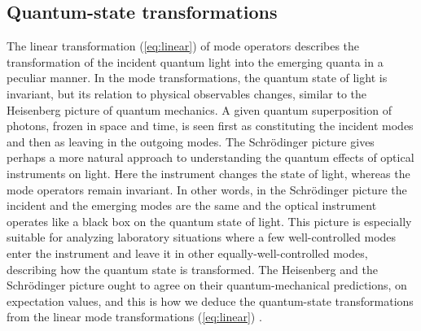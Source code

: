 \documentclass[12pt,amsmath,amssymb]{article}
\numberwithin{equation}{section}
\begin{document}
\subsection{Quantum-state transformations}

The linear transformation (\ref{eq:linear}) of mode operators describes
the transformation of the incident quantum light into the emerging
quanta in a peculiar manner.
In the mode transformations, the quantum state of light is invariant,
but its relation to physical observables changes,
similar to the Heisenberg picture of quantum mechanics.
A given quantum superposition of photons, frozen in space and time,
is seen first as constituting the incident modes and then as leaving
in the outgoing modes.
The Schr\"odinger picture gives perhaps a more natural approach
to understanding the quantum effects of optical instruments on light.
Here the instrument changes the state of light, whereas the mode
operators remain invariant. In other words, in the Schr\"odinger
picture the incident and the emerging modes are the same and the
optical instrument operates like a black box on the quantum state of light.
This picture is especially suitable for analyzing laboratory situations
where a few well-controlled modes enter the instrument and leave it
in other equally-well-controlled modes, describing how the quantum
state is transformed. The Heisenberg and the Schr\"odinger picture
ought to agree on their quantum-mechanical predictions, on
expectation values, and this is how we deduce the quantum-state
transformations from the linear mode transformations (\ref{eq:linear})
\cite{LeoNeu}.
\end{document}
